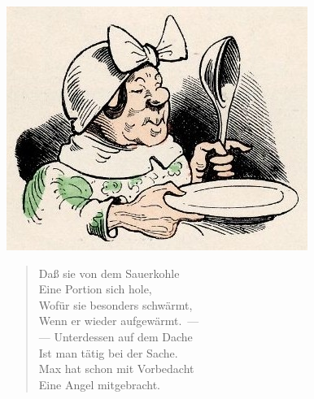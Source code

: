\documentclass[a4paper,12pt]{article}
\begin{document}
\begin{center}\includegraphics[scale=.7, alt={Vorfreude}]{images/2-04.jpg}\end{center}



\begin{verse}
Daß sie von dem Sauerkohle\\{}
Eine Portion sich hole,\\{}
Wofür sie besonders schwärmt,\\{}
Wenn er wieder aufgewärmt.~—\\{}
— Unterdessen auf dem Dache\\{}
Ist man tätig bei der Sache.\\{}
Max hat schon mit Vorbedacht\\{}
Eine Angel mitgebracht.
\end{verse}
\end{document}
